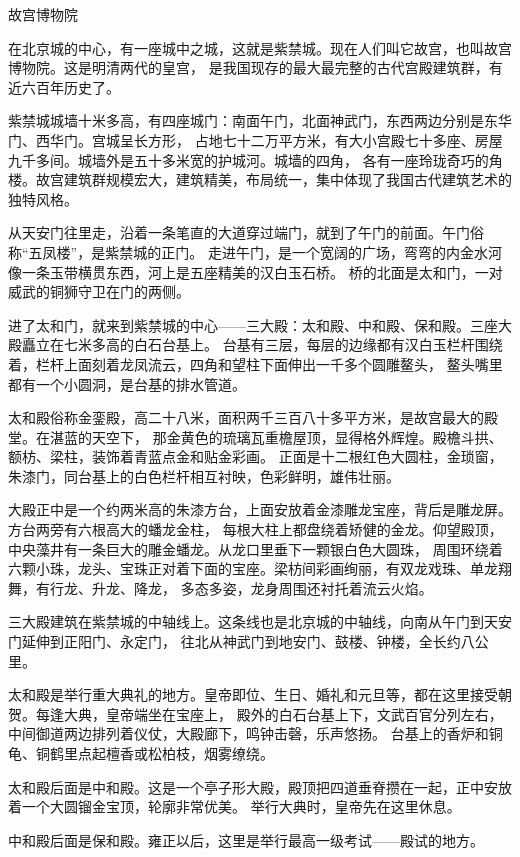 \documentclass[12pt,UTF8]{ctexbook}
\begin{document}
故宫博物院

在北京城的中心，有一座城中之城，这就是紫禁城。现在人们叫它故宫，也叫故宫博物院。这是明清两代的皇宫，
是我国现存的最大最完整的古代宫殿建筑群，有近六百年历史了。

紫禁城城墙十米多高，有四座城门：南面午门，北面神武门，东西两边分别是东华门、西华门。宫城呈长方形，
占地七十二万平方米，有大小宫殿七十多座、房屋九千多间。城墙外是五十多米宽的护城河。城墙的四角，
各有一座玲珑奇巧的角楼。故宫建筑群规模宏大，建筑精美，布局统一，集中体现了我国古代建筑艺术的独特风格。

从天安门往里走，沿着一条笔直的大道穿过端门，就到了午门的前面。午门俗称“五凤楼”，是紫禁城的正门。
走进午门，是一个宽阔的广场，弯弯的内金水河像一条玉带横贯东西，河上是五座精美的汉白玉石桥。
桥的北面是太和门，一对威武的铜狮守卫在门的两侧。

进了太和门，就来到紫禁城的中心——三大殿：太和殿、中和殿、保和殿。三座大殿矗立在七米多高的白石台基上。
台基有三层，每层的边缘都有汉白玉栏杆围绕着，栏杆上面刻着龙凤流云，四角和望柱下面伸出一千多个圆雕鳌头，
鳌头嘴里都有一个小圆洞，是台基的排水管道。

太和殿俗称金銮殿，高二十八米，面积两千三百八十多平方米，是故宫最大的殿堂。在湛蓝的天空下，
那金黄色的琉璃瓦重檐屋顶，显得格外辉煌。殿檐斗拱、额枋、梁柱，装饰着青蓝点金和贴金彩画。
正面是十二根红色大圆柱，金琐窗，朱漆门，同台基上的白色栏杆相互衬映，色彩鲜明，雄伟壮丽。

大殿正中是一个约两米高的朱漆方台，上面安放着金漆雕龙宝座，背后是雕龙屏。方台两旁有六根高大的蟠龙金柱，
每根大柱上都盘绕着矫健的金龙。仰望殿顶，中央藻井有一条巨大的雕金蟠龙。从龙口里垂下一颗银白色大圆珠，
周围环绕着六颗小珠，龙头、宝珠正对着下面的宝座。梁枋间彩画绚丽，有双龙戏珠、单龙翔舞，有行龙、升龙、降龙，
多态多姿，龙身周围还衬托着流云火焰。

三大殿建筑在紫禁城的中轴线上。这条线也是北京城的中轴线，向南从午门到天安门延伸到正阳门、永定门，
往北从神武门到地安门、鼓楼、钟楼，全长约八公里。

太和殿是举行重大典礼的地方。皇帝即位、生日、婚礼和元旦等，都在这里接受朝贺。每逢大典，皇帝端坐在宝座上，
殿外的白石台基上下，文武百官分列左右，中间御道两边排列着仪仗，大殿廊下，鸣钟击磬，乐声悠扬。
台基上的香炉和铜龟、铜鹤里点起檀香或松柏枝，烟雾缭绕。

太和殿后面是中和殿。这是一个亭子形大殿，殿顶把四道垂脊攒在一起，正中安放着一个大圆镏金宝顶，轮廓非常优美。
举行大典时，皇帝先在这里休息。

中和殿后面是保和殿。雍正以后，这里是举行最高一级考试——殿试的地方。
\end{document}
